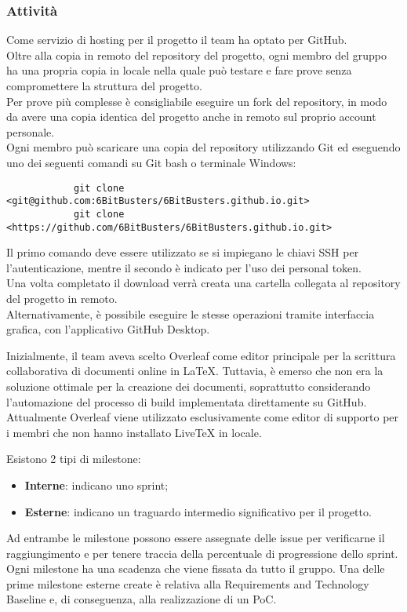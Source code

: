 \subsubsection{Attività}
Come servizio di hosting per il progetto il team ha optato per GitHub. \\Oltre
alla copia in remoto del repository del progetto, ogni membro del gruppo ha
una propria copia in locale nella quale può testare e fare prove senza
compromettere la struttura del progetto. \\Per prove più complesse è
consigliabile eseguire un fork del repository, in modo da avere una copia
identica del progetto anche in remoto sul proprio account personale.\\ 
Ogni membro può scaricare una copia del repository utilizzando Git ed
eseguendo uno dei seguenti comandi su Git bash o terminale Windows:
\begin{verbatim}
            git clone <git@github.com:6BitBusters/6BitBusters.github.io.git>
            git clone <https://github.com/6BitBusters/6BitBusters.github.io.git>
        \end{verbatim}
Il primo comando deve essere utilizzato se si impiegano le chiavi SSH per l'autenticazione, 
mentre il secondo è indicato per l'uso dei personal token.\\ Una volta completato il download verrà creata una cartella
collegata al repository del progetto in remoto.\\ Alternativamente, è possibile
eseguire le stesse operazioni tramite interfaccia grafica, con l'applicativo
GitHub Desktop.

Inizialmente, il team aveva scelto Overleaf come editor principale per la scrittura collaborativa di documenti online in LaTeX. 
Tuttavia, è emerso che non era la soluzione ottimale per la creazione dei documenti, soprattutto considerando l'automazione del processo di build implementata direttamente su GitHub. 
Attualmente Overleaf viene utilizzato esclusivamente come editor di supporto per i membri che non hanno installato LiveTeX in locale.

Esistono 2 tipi di milestone:
\begin{itemize}
    \item \textbf{Interne}: indicano uno sprint;
    \item \textbf{Esterne}: indicano un traguardo intermedio significativo per il progetto.
\end{itemize}
Ad entrambe le milestone possono essere assegnate delle issue per verificarne il raggiungimento e per tenere traccia
della percentuale di progressione dello sprint.
Ogni milestone ha una scadenza che viene fissata da tutto il gruppo. Una delle prime milestone esterne create è
relativa alla Requirements and Technology Baseline e, di conseguenza, alla realizzazione di un PoC.

